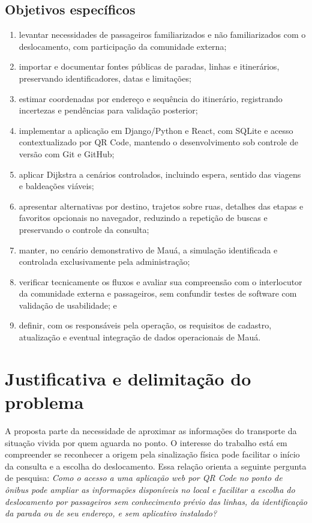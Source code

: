 \documentclass[12pt,oneside,a4paper,brazil,chapter=TITLE]{abntex2}
\let\papsection\section
\renewcommand{\section}{\clearpage\papsection}
\let\papsubsection\subsection
\renewcommand{\subsection}{\clearpage\papsubsection}
\begin{document}
\papsubsection*{Objetivos específicos}
\begin{enumerate}[label=\alph*)]
\item levantar necessidades de passageiros familiarizados e não familiarizados com o deslocamento, com participação da comunidade externa;
\item importar e documentar fontes públicas de paradas, linhas e itinerários, preservando identificadores, datas e limitações;
\item estimar coordenadas por endereço e sequência do itinerário, registrando incertezas e pendências para validação posterior;
\item implementar a aplicação em Django/Python e React, com SQLite e acesso contextualizado por QR Code, mantendo o desenvolvimento sob controle de versão com Git e GitHub;
\item aplicar Dijkstra a cenários controlados, incluindo espera, sentido das viagens e baldeações viáveis;
\item apresentar alternativas por destino, trajetos sobre ruas, detalhes das etapas e favoritos opcionais no navegador, reduzindo a repetição de buscas e preservando o controle da consulta;
\item manter, no cenário demonstrativo de Mauá, a simulação identificada e controlada exclusivamente pela administração;
\item verificar tecnicamente os fluxos e avaliar sua compreensão com o interlocutor da comunidade externa e passageiros, sem confundir testes de software com validação de usabilidade; e
\item definir, com os responsáveis pela operação, os requisitos de cadastro, atualização e eventual integração de dados operacionais de Mauá.
\end{enumerate}

\section{Justificativa e delimitação do problema}
A proposta parte da necessidade de aproximar as informações do transporte da situação vivida por quem aguarda no ponto. O interesse do trabalho está em compreender se reconhecer a origem pela sinalização física pode facilitar o início da consulta e a escolha do deslocamento. Essa relação orienta a seguinte pergunta de pesquisa: \textit{Como o acesso a uma aplicação web por QR Code no ponto de ônibus pode ampliar as informações disponíveis no local e facilitar a escolha do deslocamento por passageiros sem conhecimento prévio das linhas, da identificação da parada ou de seu endereço, e sem aplicativo instalado?}
\end{document}
